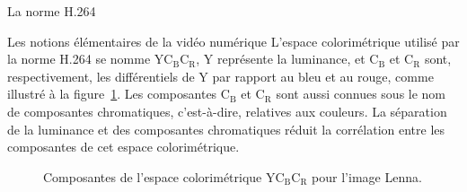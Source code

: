 \documentclass[letterpaper, twoside, 12pt,memoire]{thETS}
\begin{document}
\begin{chapter}{La norme H.264}
\begin{section}{Les notions élémentaires de la vidéo numérique}
L'espace colorimétrique utilisé par la norme H.264 se nomme
YC$_{\text{B}}$C$_{\text{R}}$, Y représente la luminance, et C$_{\text{B}}$ et
C$_{\text{R}}$ sont, respectivement, les différentiels de Y par rapport au bleu
et au rouge, comme illustré à la figure~\ref{fig-YCBCR}. Les composantes
C$_{\text{B}}$ et C$_{\text{R}}$ sont aussi connues sous le nom de composantes
chromatiques, c'est-à-dire, relatives aux couleurs. La séparation de la
luminance et des composantes chromatiques réduit la corrélation entre les
composantes de cet espace colorimétrique.

\begin{figure}[htb]
\caption{Composantes de l'espace colorimétrique YC$_{\text{B}}$C$_{\text{R}}$
pour l'image Lenna.}
\label{fig-YCBCR}
\end{figure}


\end{section}
\end{chapter}
\end{document}
